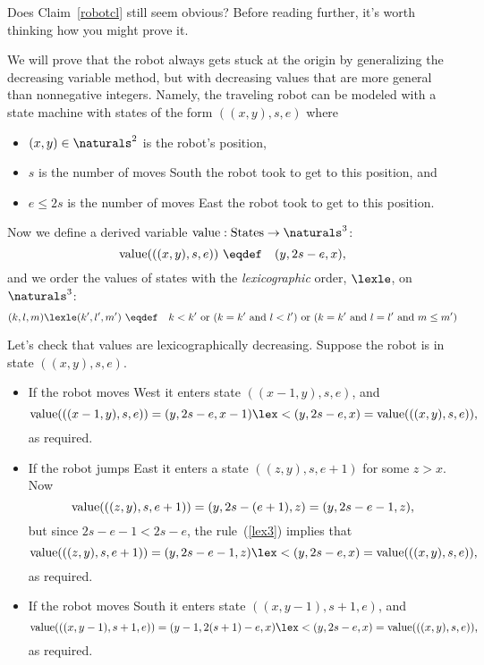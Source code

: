 Does Claim~\ref{robotcl} still seem obvious?  Before reading further, it's
worth thinking how you might prove it.

\iffalse
First give simple proof using Least Num Principle, first on number of
South moves to show robot reaches row 0, then number of East moves in row
0, then number of West moves in row 0.  Then segue into well-founded
decreasing variables.
\fi

We will prove that the robot always gets stuck at the origin by
generalizing the decreasing variable method, but with decreasing values
that are more general than nonnegative integers.  Namely, the traveling robot
can be modeled with a state machine with states of the form $((x,y),s,e)$
where
\begin{itemize}

\item $(x,y) \in \naturals^2$ is the robot's position,

\item $s$ is the number of moves South the robot took to get to this
position, and

\item $e \le 2s$ is the number of moves East the robot took to get to this
position. 

\end{itemize}

Now we define a derived variable $\vl:\text{States}\to \naturals^3$:
\[
\vl(((x,y),s,e)) \ \eqdef\quad (y,2s-e,x),
\]
and we order the values of states with the \emph{lexicographic} order,
$\lexle$, on $\naturals^3$:
\begin{equation}\label{lex3}
(k,l,m) \lexle (k',l',m') \ \eqdef\quad k < k' \text{ or } (k=k' \text{
and } l < l') \text{ or } (k=k' \text{ and } l = l' \text{ and } m \le m')
\end{equation}

Let's check that values are lexicographically decreasing.  Suppose the
robot is in state $((x,y),s,e)$.

\begin{itemize}

\item If the robot moves West it enters state $((x-1,y),s,e)$, and
\[
\vl(((x-1,y),s,e)) = (y,2s-e,x-1) \lex< (y,2s-e,x) = \vl(((x,y),s,e)),
\]
as required.


\item If the robot jumps East it enters a state $((z,y),s,e+1)$ for some
$z>x$.  Now
\[
\text{value}(((z,y),s,e+1)) = (y,2s-(e+1),z) = (y,2s-e-1,z),
\]
but since $2s-e-1 < 2s-e$, the rule~(\ref{lex3}) implies that
\[
\vl(((z,y),s,e+1)) = (y,2s-e-1,z)  \lex< (y,2s-e,x) = \vl(((x,y),s,e)),
\]
as required.

\item If the robot moves South it enters state $((x,y-1),s+1,e)$, and
\[
\vl(((x,y-1),s+1,e)) = (y-1,2(s+1)-e,x) \lex< (y,2s-e,x) = \vl(((x,y),s,e)),
\]
as required.

\end{itemize}

